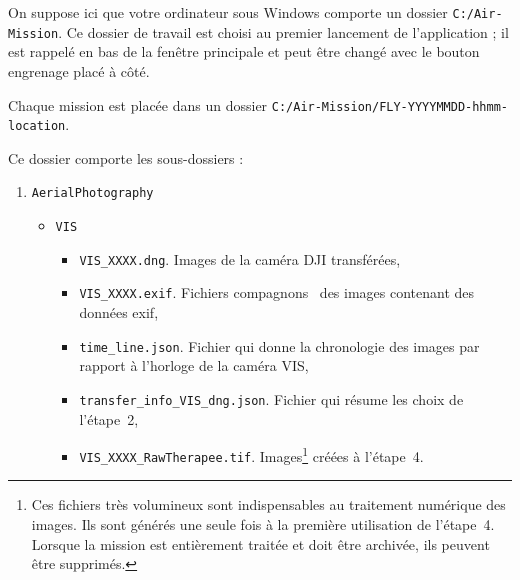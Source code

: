 \documentclass[a4paper,11pt]{report}
\newcommand{\todo}[1]{\textcolor{red}{[\`A r\'ediger : #1]}}
\begin{document}
On suppose ici que votre ordinateur sous Windows comporte un dossier \texttt{C:/Air-Mission}.
Ce dossier de travail est choisi au premier lancement de l'application ; il est rappel\'e en bas de la fen\^etre
principale et peut \^etre chang\'e avec le bouton \og engrenage \fg{} plac\'e \`a c\^ot\'e.

Chaque mission est placée dans un dossier \texttt{C:/Air-Mission/FLY-YYYYMMDD-hhmm-location}. 

Ce dossier comporte les sous-dossiers :
\begin{enumerate}
	\item \texttt{AerialPhotography}
	      \begin{itemize}
	      	\item \texttt{VIS}
	      	  \begin{itemize}
	      	  	\item \texttt{VIS\_XXXX.dng}. Images de la caméra DJI transférées,
	      	  	\item \texttt{VIS\_XXXX.exif}. Fichiers \og compagnons \fg~des images contenant des données exif,
	      	  	\item \texttt{time\_line.json}. Fichier qui donne la chronologie des images par rapport à l'horloge de la caméra VIS,
	      	  	\item \texttt{transfer\_info\_VIS\_dng.json}. Fichier qui résume les choix de l'étape~2,
	      	  	\item \texttt{VIS\_XXXX\_RawTherapee.tif}. Images\footnote{\label{fn:rawtherapee_1}Ces fichiers très volumineux sont indispensables au traitement numérique des images. Ils sont générés une seule fois à la première utilisation de l'étape~4. Lorsque la mission est entièrement traitée et doit être archivée, ils peuvent être supprimés.} créées à l'étape~4.
	      	  \end{itemize}
	      		

\end{itemize}
\end{enumerate}
\end{document}
